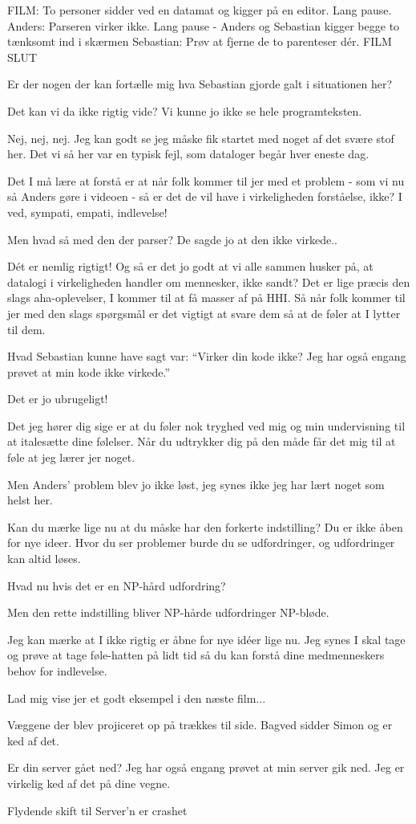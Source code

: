 \documentclass[a4paper,11pt]{article}
\begin{document}
\begin{sketch}
\scene FILM:
\scene To personer sidder ved en datamat og kigger på en editor.
\scene Lang pause.
\scene Anders: Parseren virker ikke.
\scene Lang pause - Anders og Sebastian kigger begge to tænksomt ind i skærmen
\scene Sebastian: Prøv at fjerne de to parenteser dér.
\scene FILM SLUT

 Er der nogen der kan fortælle mig hva Sebastian gjorde galt i situationen her?

 Det kan vi da ikke rigtig vide? Vi kunne jo ikke se hele programteksten.

 Nej, nej, nej. Jeg kan godt se jeg måske fik startet med noget af det svære stof her.
 Det vi så her var en typisk fejl, som dataloger begår hver eneste dag.

 Det I må lære at forstå er at når folk kommer til jer med et problem - som vi nu så Anders gøre i videoen - så er det de vil have i virkeligheden forståelse, ikke? I ved, sympati, empati, indlevelse!

 Men hvad så med den der parser? De sagde jo at den ikke virkede..

 Dét er nemlig rigtigt! Og så er det jo godt at vi alle sammen husker på, at datalogi i virkeligheden handler om mennesker, ikke sandt? Det er lige præcis den slags aha-oplevelser, I kommer til at få masser af på HHI. Så når folk kommer til jer med den slags spørgsmål er det vigtigt at svare dem så at de føler at I lytter til dem.

 Hvad Sebastian kunne have sagt var: ``Virker din kode ikke? Jeg har også
engang prøvet at min kode ikke virkede.''

 Det er jo ubrugeligt!

 Det jeg hører dig sige er at du føler nok tryghed ved mig og min undervisning til at italesætte dine følelser. Når du udtrykker dig på den måde får det mig til at føle at jeg lærer jer noget.

 Men Anders' problem blev jo ikke løst, jeg synes ikke jeg har lært noget som helst 
her.

 Kan du mærke lige nu at du måske har den forkerte indstilling? Du er ikke åben for nye ideer. Hvor du ser problemer burde du se udfordringer, og udfordringer kan altid løses.

 Hvad nu hvis det er en NP-hård udfordring?

 Men den rette indstilling bliver NP-hårde udfordringer NP-bløde.

 Jeg kan mærke at I ikke rigtig er åbne for nye idéer lige nu. Jeg synes I skal tage og prøve at tage føle-hatten på lidt tid så du kan forstå dine medmenneskers behov for indlevelse.

 Lad mig vise jer et godt eksempel i den næste film...

\scene Væggene der blev projiceret op på trækkes til side. Bagved sidder Simon og er ked af det.

 Er din server gået ned? Jeg har også engang prøvet at min server gik ned. Jeg er virkelig ked af det på dine vegne.

\scene Flydende skift til Server'n er crashet

  \end{sketch}
\end{document}
